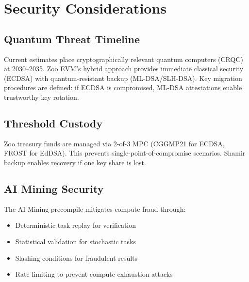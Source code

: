 \section{Security Considerations}


\subsection{Quantum Threat Timeline}

Current estimates place cryptographically relevant quantum computers (CRQC) at 2030--2035. Zoo EVM's hybrid approach provides immediate classical security (ECDSA) with quantum-resistant backup (ML-DSA/SLH-DSA). Key migration procedures are defined: if ECDSA is compromised, ML-DSA attestations enable trustworthy key rotation.

\subsection{Threshold Custody}

Zoo treasury funds are managed via 2-of-3 MPC (CGGMP21 for ECDSA, FROST for EdDSA). This prevents single-point-of-compromise scenarios. Shamir backup enables recovery if one key share is lost.

\subsection{AI Mining Security}

The AI Mining precompile mitigates compute fraud through:
\begin{itemize}[nosep]
  \item Deterministic task replay for verification
  \item Statistical validation for stochastic tasks
  \item Slashing conditions for fraudulent results
  \item Rate limiting to prevent compute exhaustion attacks
\end{itemize}

